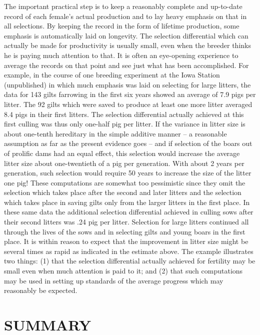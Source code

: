 The important practical step is to keep a reasonably complete and
up-to-date record of each female's actual production and to lay heavy
emphasis on that in all selections. By keeping the record in the form of
lifetime production, some emphasis is automatically laid on longevity.
The selection differential which can actually be made for productivity
is usually small, even when the breeder thinks he is paying much attention
to that. It is often an eye-opening experience to average the records
on that point and see just what has been accomplished. For example, in
the course of one breeding experiment at the Iowa Station (unpublished)
in which much emphasis was laid on selecting for large litters,
the data for 143 gilts farrowing in the first six years showed an average
of 7.9 pigs per litter. The 92 gilts which were saved to produce at least
one more litter averaged 8.4 pigs in their first litters. The selection
differential actually achieved at this first culling was thus only one-half
pig per litter. If the variance in litter size is about one-tenth hereditary
in the simple additive manner -- a reasonable assumption as far as the
present evidence goes -- and if selection of the boars out of prolific dams
had an equal effect, this selection would increase the average litter size
about one-twentieth of a pig per generation. With about 2 years per
generation, such selection would require 50 years to increase the size of
the litter one pig! These computations are somewhat too pessimistic
since they omit the selection which takes place after the second and later
litters and the selection which takes place in saving gilts only from the
larger litters in the first place. In these same data the additional selection
differential achieved in culling sows after their second litters was
.24 pig per litter. Selection for large litters continued all through the
lives of the sows and in selecting gilts and young boars in the first place.
It is within reason to expect that the improvement in litter size might
be several times as rapid as indicated in the estimate above. The example
illustrates two things: (1) that the selection differential actually
achieved for fertility may be small even when much attention is paid to
it; and (2) that such computations may be used in setting up standards
of the average progress which may reasonably be expected.

\section*{SUMMARY}

